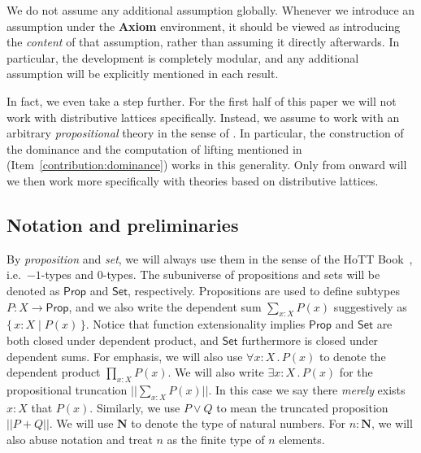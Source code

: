 \documentclass[12pt]{amsart}
\theoremstyle{definition}
\newcommand{\mb}[1]{\mathbf{#1}}
\newcommand{\ms}[1]{\mathsf{#1}}
\newcommand{\scomp}[2]{\{\,#1\mid#2\,\}}
\newcommand{\N}{\mb N}
\newcommand{\fa}[2]{\forall #1\!\colon\!\!#2\mathpunct{.}}
\newcommand{\ex}[2]{\exists #1\!\colon\!\!#2\mathpunct{.}}
\newcommand{\pss}[1]{||#1||} %
\newcommand{\pp}{\ms{Prop}}
\newcommand{\st}{\ms{Set}}
\begin{document}
We do not assume any additional assumption globally. Whenever we introduce an assumption under the \textbf{Axiom} environment, it should be viewed as introducing the \emph{content} of that assumption, rather than assuming it directly afterwards. In particular, the development is completely modular, and any additional assumption will be explicitly mentioned in each result.

In fact, we even take a step further. For the first half of this paper we will not work with distributive lattices specifically. Instead, we assume to work with an arbitrary \emph{propositional} theory in the sense of . In particular, the construction of the dominance and the computation of lifting mentioned in  (Item~\ref{contribution:dominance}) works in this generality. Only from  onward will we then work more specifically with theories based on distributive lattices.

\subsection*{Notation and preliminaries}

By \emph{proposition} and \emph{set}, we will always use them in the sense of the HoTT Book~\cite{hottbook}, i.e.\ $-1$-types and $0$-types. The subuniverse of propositions and sets will be denoted as $\pp$ and $\st$, respectively. Propositions are used to define subtypes $P : X \to \pp$, and we also write the dependent sum $\sum_{x:X}P(x)$ suggestively as $\scomp{x:X}{P(x)}$. Notice that function extensionality implies $\pp$ and $\st$ are both closed under dependent product, and $\st$ furthermore is closed under dependent sums. For emphasis, we will also use $\fa xXP(x)$ to denote the dependent product $\prod_{x:X}P(x)$. We will also write $\ex xXP(x)$ for the propositional truncation $\pss{\sum_{x:X}P(x)}$. In this case we say there \emph{merely} exists $x:X$ that $P(x)$. Similarly, we use $P \vee Q$ to mean the truncated proposition $\pss{P + Q}$. We will use $\N$ to denote the type of natural numbers. For $n:\N$, we will also abuse notation and treat $n$ as the finite type of $n$ elements. 

\end{document}
